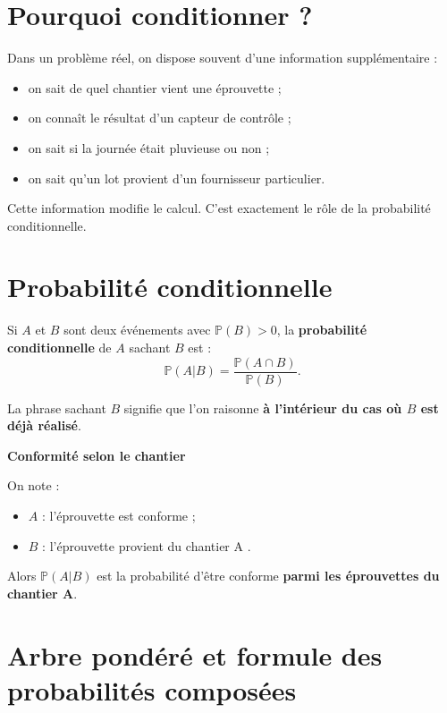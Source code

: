 
\section{Pourquoi conditionner ?}

Dans un problème réel, on dispose souvent d'une information supplémentaire :
\begin{itemize}
    \item on sait de quel chantier vient une éprouvette ;
    \item on connaît le résultat d'un capteur de contrôle ;
    \item on sait si la journée était pluvieuse ou non ;
    \item on sait qu'un lot provient d'un fournisseur particulier.
\end{itemize}

Cette information modifie le calcul. C'est exactement le rôle de la probabilité conditionnelle.

\section{Probabilité conditionnelle}

\begin{Def}
Si $A$ et $B$ sont deux événements avec $\mathbb{P}(B)>0$, la \textbf{probabilité conditionnelle} de $A$ sachant $B$ est :
$$
\mathbb{P}(A|B)=\frac{\mathbb{P}(A\cap B)}{\mathbb{P}(B)}.
$$
\end{Def}

\begin{Rmq}
La phrase \og sachant $B$ \fg{} signifie que l'on raisonne \textbf{à l'intérieur du cas où $B$ est déjà réalisé}.
\end{Rmq}

\begin{Ex}
\textbf{Conformité selon le chantier}

On note :
\begin{itemize}
    \item $A$ : \og l'éprouvette est conforme \fg ;
    \item $B$ : \og l'éprouvette provient du chantier A \fg.
\end{itemize}

Alors $\mathbb{P}(A|B)$ est la probabilité d'être conforme \textbf{parmi les éprouvettes du chantier A}.
\end{Ex}

\section{Arbre pondéré et formule des probabilités composées}

